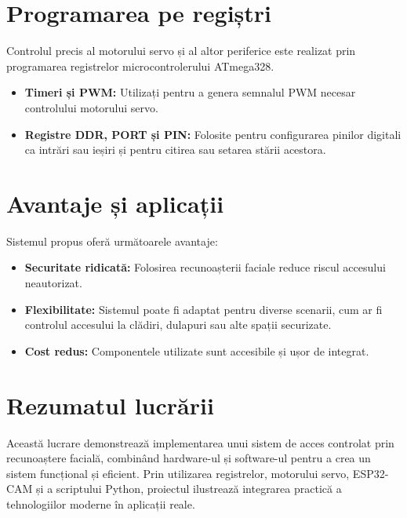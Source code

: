 \documentclass{report}
\begin{document}
\section{Programarea pe regiștri}
Controlul precis al motorului servo și al altor periferice este realizat prin programarea registrelor microcontrolerului ATmega328. 
\begin{itemize}
    \item \textbf{Timeri și PWM:} Utilizați pentru a genera semnalul PWM necesar controlului motorului servo.
    \item \textbf{Registre DDR, PORT și PIN:} Folosite pentru configurarea pinilor digitali ca intrări sau ieșiri și pentru citirea sau setarea stării acestora.
\end{itemize}

\section{Avantaje și aplicații}
Sistemul propus oferă următoarele avantaje:
\begin{itemize}
    \item \textbf{Securitate ridicată:} Folosirea recunoașterii faciale reduce riscul accesului neautorizat.
    \item \textbf{Flexibilitate:} Sistemul poate fi adaptat pentru diverse scenarii, cum ar fi controlul accesului la clădiri, dulapuri sau alte spații securizate.
    \item \textbf{Cost redus:} Componentele utilizate sunt accesibile și ușor de integrat.
\end{itemize}
\vspace*{1cm}
\section{Rezumatul lucrării}
Această lucrare demonstrează implementarea unui sistem de acces controlat prin recunoaștere facială, combinând hardware-ul și software-ul pentru a crea un sistem funcțional și eficient. Prin utilizarea registrelor, motorului servo, ESP32-CAM și a scriptului Python, proiectul ilustrează integrarea practică a tehnologiilor moderne în aplicații reale.
\end{document}
